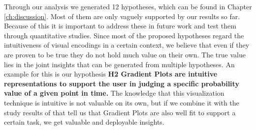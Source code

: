 Through our analysis we generated 12 hypotheses, which can be found in Chapter \ref{ch:discussion}. Most of them are only vaguely supported by our results so far. Because of this it is important to address these in future work and test them through quantitative studies. Since most of the proposed hypotheses regard the intuitiveness of visual encodings in a certain context, we believe that even if they are proven to be true they do not hold much value on their own. The true value lies in the joint insights that can be generated from multiple hypotheses. An example for this is our hypothesis \textbf{H2 Gradient Plots are intuitive representations to support the user in judging a specific probability value of a given point in time.} The knowledge that this visualization technique is intuitive is not valuable on its own, but if we combine it with the study results of \citet{gschwandtner2016visual} that tell us that Gradient Plots are also well fit to support a certain task, we get valuable and deployable insights. \par \medskip